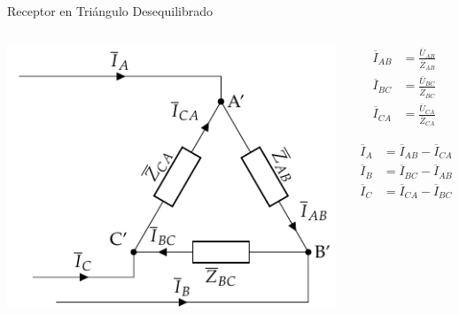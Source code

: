 \documentclass[aspectratio=169, usenames,svgnames,dvipsnames]{beamer}
\begin{document}
\begin{frame}[label={sec:orgeb429e1}]{Receptor en Triángulo Desequilibrado}
\begin{columns}
\begin{column}{0.6\columnwidth}
\begin{center}
\includegraphics[width=.9\linewidth]{../figs/TrianguloDesequilibrado_Receptor.pdf}
\end{center}
\end{column}

\begin{column}{0.4\columnwidth}
\begin{align*}
  \overline{I}_{AB} &= \frac{\overline{U}_{AB}}{\overline{Z}_{AB}}\\
  \overline{I}_{BC} &= \frac{\overline{U}_{BC}}{\overline{Z}_{BC}}\\
  \overline{I}_{CA} &= \frac{\overline{U}_{CA}}{\overline{Z}_{CA}}
\end{align*}

\begin{align*}
  \overline{I}_A &= \overline{I}_{AB} - \overline{I}_{CA}\\
  \overline{I}_B &= \overline{I}_{BC} - \overline{I}_{AB}\\
  \overline{I}_C &= \overline{I}_{CA} - \overline{I}_{BC}\\
\end{align*}
\end{column}
\end{columns}
\end{frame}
\end{document}
